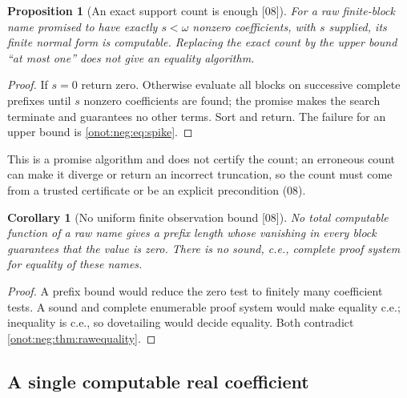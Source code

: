\documentclass[11pt,oneside]{article}
\numberwithin{equation}{section}
\newtheorem{proposition}[proposition]{Proposition}
\newtheorem{corollary}[corollary]{Corollary}
\theoremstyle{definition}
\theoremstyle{remark}
\newcommand{\src}[1]{\textup{\textsf{\small[#1]}}}
\begin{document}
\begin{proposition}[An exact support count is enough \src{08}]\label{onot:neg:prop:count}
For a raw finite-block name promised to have exactly $s<\omega$ nonzero
coefficients, with $s$ supplied, its finite normal form is computable. Replacing
the exact count by the upper bound ``at most one'' does not give an equality
algorithm.
\end{proposition}
\begin{proof}
If $s=0$ return zero. Otherwise evaluate all blocks on successive complete
prefixes until $s$ nonzero coefficients are found; the promise makes the search
terminate and guarantees no other terms. Sort and return. The failure for an upper
bound is \eqref{onot:neg:eq:spike}.
\end{proof}
This is a promise algorithm and does not certify the count; an erroneous count
can make it diverge or return an incorrect truncation, so the count must come from
a trusted certificate or be an explicit precondition (08).

\begin{corollary}[No uniform finite observation bound \src{08}]\label{onot:neg:cor:nojet}
No total computable function of a raw name gives a prefix length whose vanishing in
every block guarantees that the value is zero. There is no sound, c.e., complete
proof system for equality of these names.
\end{corollary}
\begin{proof}
A prefix bound would reduce the zero test to finitely many coefficient tests. A
sound and complete enumerable proof system would make equality c.e.; inequality is
c.e., so dovetailing would decide equality. Both contradict
\cref{onot:neg:thm:rawequality}.
\end{proof}

\subsection{A single computable real coefficient}
\end{document}
